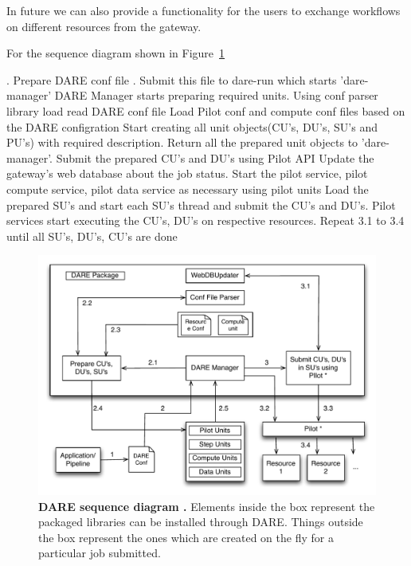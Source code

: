 \documentclass[]{svjour3}
\begin{document}
In future we can also provide a functionality for the users to exchange workflows on different resources from the gateway. 

For the sequence diagram shown in Figure~\ref{fig:dare-seqence}

. Prepare DARE conf file  . Submit this file to dare-run which starts 'dare-manager'\newline
{} DARE Manager starts preparing required units.\newline
{} Using conf parser library load read DARE conf file\newline
{} Load Pilot conf and compute conf files based on the DARE configration\newline
{} Start creating all unit objects(CU's, DU's, SU's and PU's) with required description. \newline
{} Return all the prepared unit objects to 'dare-manager'. Submit the prepared CU's and DU's using Pilot API\newline
{} Update the gateway's web database about the job status.\newline
{} Start the pilot service, pilot compute service, pilot data service as necessary using pilot units\newline
{} Load the prepared SU's and start each SU's thread and submit the CU's and DU's.\newline
{} Pilot services start executing the CU's, DU's on respective resources.  \newline
{} Repeat 3.1 to 3.4 until all SU's, DU's, CU's are done\newline


\begin{figure}[t]
\centering \includegraphics[width=1\textwidth]{figures/DARE_Sequence.pdf}
\caption{\textbf{ DARE sequence diagram .} Elements inside the box represent the packaged libraries can be installed through DARE. 
Things outside the box represent the ones which are created on the fly for a particular job submitted. }
 \label{fig:dare-seqence}
\end{figure}
\end{document}
